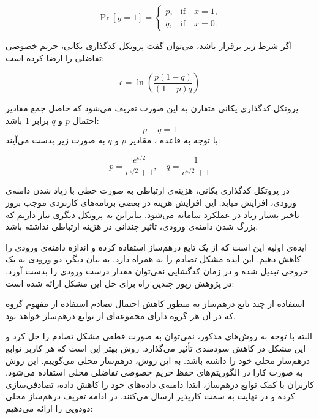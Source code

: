 \begin{equation}
\Pr[y = 1] =
\begin{cases} 
p, & \text{if} \quad x = 1, \\[10pt]
q, & \text{if} \quad x = 0.
\end{cases}
\end{equation}

اگر شرط زیر برقرار باشد، می‌توان گفت پروتکل کدگذاری یکانی، حریم خصوصی تفاضلی را ارضا کرده است:


\begin{equation}
\epsilon = \ln \left( \frac{p(1 - q)}{(1 - p)q} \right)
\label{equ:unary}
\end{equation}


پروتکل کدگذاری یکانی متقارن به این صورت تعریف می‌شود که حاصل جمع مقادیر احتمال $p$ و $q$ برابر 1 باشد:
$$p + q = 1$$
با توجه به قاعده ، مقادیر $p$ و $q$ به صورت زیر بدست می‌آیند:

$$p = \frac{e^{\epsilon/2}}{e^{\epsilon/2} + 1}, \quad q = \frac{1}{e^{\epsilon/2} + 1}$$


در پروتکل کدگذاری یکانی، هزینه‌ی ارتباطی به صورت خطی با زیاد شدن دامنه‌ی ورودی، افزایش میابد. این افزایش هزینه در بعضی برنامه‌های کاربردی موجب بروز تاخیر بسیار زیاد در عملکرد سامانه می‌شود. بنابراین به پروتکل دیگری نیاز داریم که بزرگ شدن دامنه‌ی ورودی، تاثیر چندانی در هزینه ارتباطی نداشته باشد.

ایده‌ی اولیه این است که از یک تابع درهم‌ساز استفاده کرده و اندازه‌ دامنه‌ی ورودی را کاهش دهیم. این ایده مشکل تصادم را به همراه دارد. به بیان دیگر، دو ورودی به یک خروجی تبدیل شده و در زمان کدگشایی نمی‌توان مقدار درست ورودی را بدست آورد. در پژوهش رپور  چندین راه برای حل این مشکل ارائه شده است:

 استفاده از چند تابع درهم‌ساز به منظور کاهش احتمال تصادم
 استفاده از مفهوم گروه که در آن هر گروه دارای مجموعه‌ای از توابع درهم‌ساز خواهد بود.

البته با توجه به روش‌های مذکور، نمی‌توان به صورت قطعی مشکل تصادم را حل کرد و این مشکل در کاهش سودمندی تأثیر می‌گذارد. روش بهتر این است که هر کاربر توابع درهم‌ساز محلی خود را داشته باشد. به این روش، درهم‌ساز محلی می‌گوییم. این روش به صورت کارا در الگوریتم‌های حفظ حریم خصوصی تفاضلی محلی استفاده می‌شود. کاربران با کمک توابع درهم‌ساز، ابتدا دامنه‌ی داده‌های خود را کاهش داده، تصادفی‌سازی کرده و در نهایت به سمت کارپذیر ارسال می‌کنند. در ادامه تعریف درهم‌ساز محلی دودویی را ارائه می‌دهیم:


